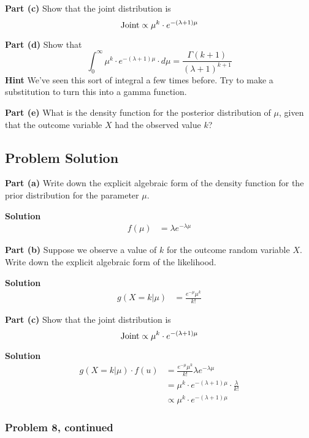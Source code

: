 \documentclass[12pt]{article}
\theoremstyle{definition}
\begin{document}
\bigskip
\noindent
{\bf Part (c)} Show that the joint distribution is
$$
\hbox{Joint} \propto \mu^k \cdot e^{-(\lambda + 1) \mu}
$$

\bigskip
\noindent
{\bf Part (d)} Show that
$$
\int_0^\infty \mu^{k} \cdot e^{-(\lambda+1) \mu} \cdot d\mu = \frac{ \Gamma( k + 1 ) }{(\lambda + 1)^{k+1} }
$$
\noindent
{\bf Hint} We've seen this sort of integral a few times before. Try to make a substitution to turn this into a gamma function.

\bigskip
\noindent
{\bf Part (e)} What is the density function for the posterior distribution of $\mu$, given that the outcome variable $X$ had the observed value $k$?


\newpage
\subsection*{Problem Solution}

\noindent
{\bf Part (a)} Write down the explicit algebraic form of the density function for the prior distribution for the parameter $\mu$.

\bigskip
\noindent
{\bf Solution}
\begin{align*}
f(\mu) &= \lambda e^{-\lambda\mu}
\end{align*}


\noindent
{\bf Part (b)} Suppose we observe a value of $k$ for the outcome random variable $X$. Write down the explicit algebraic form of the likelihood.

\bigskip
\noindent
{\bf Solution}
\begin{align*}
g(X=k|\mu) &= \frac{e^{-\mu}\mu^k}{k!}
\end{align*}

\noindent
{\bf Part (c)} Show that the joint distribution is
$$
\hbox{Joint} \propto \mu^k \cdot e^{-(\lambda + 1) \mu}
$$


\bigskip
\noindent
{\bf Solution}
\begin{align*}
g(X=k|\mu)\cdot f(u) &= \frac{e^{-\mu}\mu^k}{k!} \lambda e^{-\lambda\mu}\\
&= \mu^k \cdot e^{-(\lambda + 1)\mu}\cdot\frac{\lambda}{k!}\\
&\propto \mu^k \cdot e^{-(\lambda + 1)\mu}
\end{align*}

\newpage

\subsubsection*{Problem 8, continued}
\end{document}
